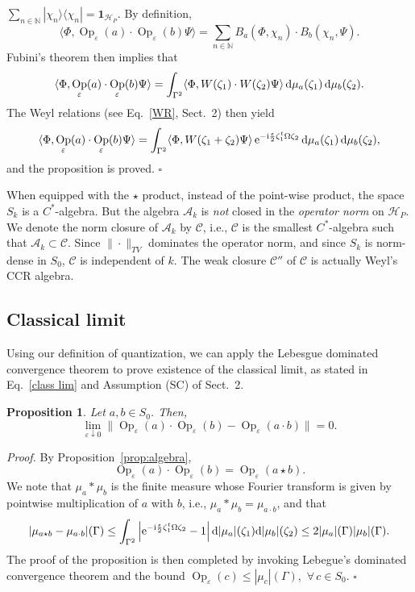 \documentclass[12pt]{article}
\DeclareMathOperator{\Op}{Op}
\newcommand{\id}{\mathbf{1}}
\newcommand{\nn}{\mathbb{N}}
\renewcommand{\d}{{\rm d}}
\newcommand{\e}{{\rm e}}
\renewcommand{\i}{{\rm i}}
\newtheorem{proposition}[theorem]{Proposition}
\begin{document}
$\sum_{n\in \nn} |\chi_n\rangle\langle\chi_n|=\id_{\mathcal H_P}$. By definition,
$$\langle \Phi,\Op_{\varepsilon}(a)\cdot \Op_\varepsilon(b)\Psi\rangle=\sum_{n\in \nn} B_a(\Phi,\chi_n)\cdot B_b(\chi_n,\Psi).$$
Fubini's theorem then implies that
$$\langle \Phi,\Op_{\varepsilon}(a)\cdot \Op_\varepsilon(b)\Psi\rangle=\int_{\Gamma^2}\langle \Phi,W(\zeta_1)\cdot W(\zeta_2)\Psi\rangle\, \d\mu_a(\zeta_1)\,\d\mu_b(\zeta_2).$$
The Weyl relations (see Eq.~\eqref{WR}, Sect.~2) then yield
$$\langle \Phi,\Op_{\varepsilon}(a)\cdot \Op_\varepsilon(b)\Psi\rangle=\int_{\Gamma^2}\langle \Phi,W(\zeta_1+\zeta_2)\Psi\rangle\, \e^{-\i\frac\epsilon2\zeta_1^t\Omega\zeta_2}\,\d\mu_a(\zeta_1)\,\d\mu_b(\zeta_2),$$
and the proposition is proved. \hfill{$\square$}


\vspace{0.15cm} When equipped with the $\star$ product, instead of the point-wise product, the space $S_k$ is a $C^*$-algebra. 
But the algebra $\mathcal A_k$ is \textit{not} closed in the \textit{operator norm} on $\mathcal H_P$. We denote the 
norm closure of $\mathcal A_k$ by $\mathcal C$, i.e., $\mathcal{C}$ is the smallest $C^*$-algebra such that 
$\mathcal A_k\subset \mathcal C$. Since $\|\cdot\|_{TV}$ dominates the operator norm, and since $S_k$ is 
norm-dense in $S_0$, $\mathcal C$ is independent of $k$. The weak closure $\mathcal C''$ of 
$\mathcal C$ is actually Weyl's CCR algebra. 

\subsection{Classical limit}
Using our definition of quantization, we can apply the Lebesgue dominated convergence theorem to prove existence of
the classical limit, as stated in Eq.~\eqref{class lim} and Assumption (SC) of Sect.~2.

\begin{proposition}\label{prop:classical_limit_product}
Let $a,b\in S_0$. Then,
$$\lim_{\varepsilon\downarrow 0} \|\Op_\varepsilon(a)\cdot \Op_\varepsilon(b)-\Op_\varepsilon(a\cdot b)\|=0.$$
\end{proposition}
\noindent \textit{Proof.} By Proposition~\ref{prop:algebra},
$$\Op_\varepsilon(a)\cdot \Op_\varepsilon(b)=\Op_\varepsilon(a\star b).$$
We note that $\mu_a\ast\mu_b$ is the finite measure whose Fourier transform is given by pointwise multiplication of 
$a$ with $b$, i.e., $\mu_a*\mu_b=\mu_{a\cdot b}$, and that
$$|\mu_{a\star b}-\mu_{a\cdot b}|(\Gamma)\leq\int_{\Gamma^2} \left|\e^{-\i\frac{\epsilon}2\zeta_1^t\Omega\zeta_2}-1
\right|\d|\mu_a|(\zeta_1)\d|\mu_b|(\zeta_2)\leq 2 \vert \mu_a\vert (\Gamma) \vert \mu_{b}\vert(\Gamma).$$
The proof of the proposition is then completed by invoking Lebegue's dominated convergence theorem 
and the bound $\Op_\varepsilon(c)\leq |\mu_c|(\Gamma)$, \,$\forall\,c\in S_0$.  \hfill{$\square$}
\end{document}
